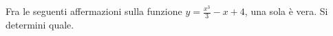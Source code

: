 Fra le seguenti affermazioni sulla funzione $y=\frac{x^3}{3}-x+4$, una sola è vera. 
Si determini quale.
